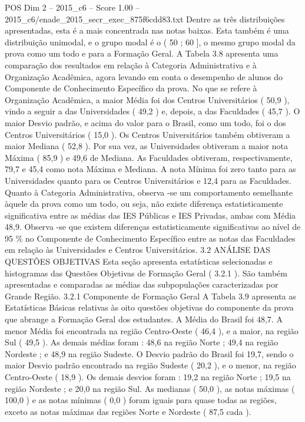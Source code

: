 \begin{textsample}{POS Dim 2 – 2015\_c6 – Score 1.00 – 2015\_c6/enade\_2015\_secr\_exec\_875f6cdd83.txt}
Dentre as três distribuições apresentadas, esta é a mais concentrada nas notas baixas.
Esta também é uma distribuição unimodal, e o grupo modal é o ( 50 ; 60 ], o mesmo grupo modal da prova como um todo e para a Formação Geral.
A Tabela 3.8 apresenta uma comparação dos resultados em relação à Categoria Administrativa e à Organização Acadêmica, agora levando em conta o desempenho de alunos do Componente de Conhecimento Específico da prova.
No que se refere à Organização Acadêmica, a maior Média foi dos Centros Universitários ( 50,9 ), vindo a seguir a das Universidades ( 49,2 ) e, depois, a das Faculdades ( 45,7 ).
O maior Desvio padrão, e acima do valor para o Brasil, como um todo, foi o dos Centros Universitários ( 15,0 ).
Os Centros Universitários também obtiveram a maior Mediana ( 52,8 ).
Por sua vez, as Universidades obtiveram a maior nota Máxima ( 85,9 ) e 49,6 de Mediana.
As Faculdades obtiveram, respectivamente, 79,7 e 45,4 como nota Máxima e Mediana.
A nota Mínima foi zero tanto para as Universidades quanto para os Centros Universitários e 12,4 para as Faculdades.
Quanto à Categoria Administrativa, observa -se um comportamento semelhante àquele da prova como um todo, ou seja, não existe diferença estatisticamente significativa entre as médias das IES Públicas e IES Privadas, ambas com Média 48,9.
Observa -se que existem diferenças estatisticamente significativas ao nível de 95 \% no Componente de Conhecimento Específico entre as notas das Faculdades em relação às Universidades e Centros Universitários. 3.2 ANÁLISE DAS QUESTÕES OBJETIVAS Esta seção apresenta estatísticas selecionadas e histogramas das Questões Objetivas de Formação Geral ( 3.2.1 ).
São também apresentadas e comparadas as médias das subpopulações caracterizadas por Grande Região. 3.2.1 Componente de Formação Geral A Tabela 3.9 apresenta as Estatísticas Básicas relativas às oito questões objetivas do componente da prova que abrange a Formação Geral dos estudantes.
A Média do Brasil foi 48,7.
A menor Média foi encontrada na região Centro-Oeste ( 46,4 ), e a maior, na região Sul ( 49,5 ).
As demais médias foram : 48,6 na região Norte ; 49,4 na região Nordeste ; e 48,9 na região Sudeste.
O Desvio padrão do Brasil foi 19,7, sendo o maior Desvio padrão encontrado na região Sudeste ( 20,2 ), e o menor, na região Centro-Oeste ( 18,9 ).
Os demais desvios foram : 19,2 na região Norte ; 19,5 na região Nordeste ; e 20,0 na região Sul.
As medianas ( 50,0 ), as notas máximas ( 100,0 ) e as notas mínimas ( 0,0 ) foram iguais para quase todas as regiões, exceto as notas máximas das regiões Norte e Nordeste ( 87,5 cada ).

\end{textsample}
